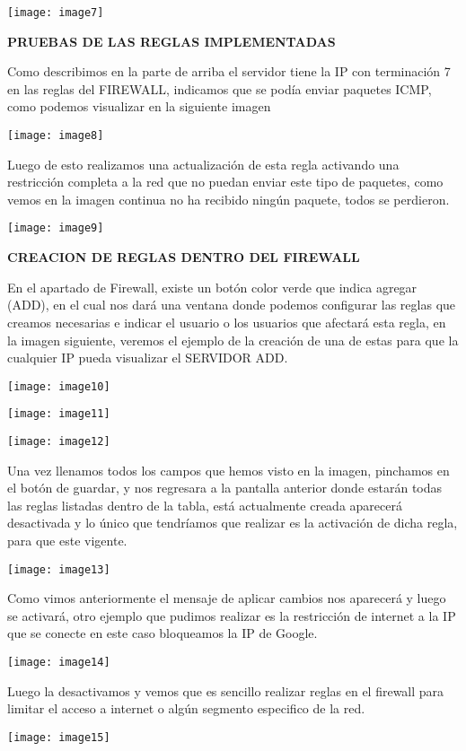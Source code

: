 \documentclass{book} %
\begin{document}
\noindent \texttt{[image: image7]}

\noindent \textbf{PRUEBAS DE LAS REGLAS IMPLEMENTADAS }

\noindent Como describimos en la parte de arriba el servidor tiene la IP con terminaci\'{o}n 7 en las reglas del FIREWALL, indicamos que se pod\'{i}a enviar paquetes ICMP, como podemos visualizar en la siguiente imagen

\noindent 

\noindent \texttt{[image: image8]}

\noindent Luego de esto realizamos una actualizaci\'{o}n de esta regla activando una restricci\'{o}n completa a la red que no puedan enviar este tipo de paquetes, como vemos en la imagen continua no ha recibido ning\'{u}n paquete, todos se perdieron.

\noindent \texttt{[image: image9]}

\noindent 

\noindent \textbf{CREACION DE REGLAS DENTRO DEL FIREWALL}

\noindent En el apartado de Firewall, existe un bot\'{o}n color verde que indica agregar (ADD), en el cual nos dar\'{a} una ventana donde podemos configurar las reglas que creamos necesarias e indicar el usuario o los usuarios que afectar\'{a} esta regla, en la imagen siguiente, veremos el ejemplo de la creaci\'{o}n de una de estas para que la cualquier IP pueda visualizar el SERVIDOR ADD.

\noindent \texttt{[image: image10]}

\noindent \texttt{[image: image11]}

\noindent \texttt{[image: image12]}

\noindent Una vez llenamos todos los campos que hemos visto en la imagen, pinchamos en el bot\'{o}n de guardar, y nos regresara a la pantalla anterior donde estar\'{a}n todas las reglas listadas dentro de la tabla, est\'{a} actualmente creada aparecer\'{a} desactivada y lo \'{u}nico que tendr\'{i}amos que realizar es la activaci\'{o}n de dicha regla, para que este vigente. 

\noindent \texttt{[image: image13]}

\noindent 

\noindent Como vimos anteriormente el mensaje de aplicar cambios nos aparecer\'{a} y luego se activar\'{a}, otro ejemplo que pudimos realizar es la restricci\'{o}n de internet a la IP que se conecte en este caso bloqueamos la IP de Google.

\noindent  \texttt{[image: image14]}

\noindent 

\noindent Luego la desactivamos y vemos que es sencillo realizar reglas en el firewall para limitar el acceso a internet o alg\'{u}n segmento especifico de la red.

\noindent 

\noindent \texttt{[image: image15]}
\end{document}
